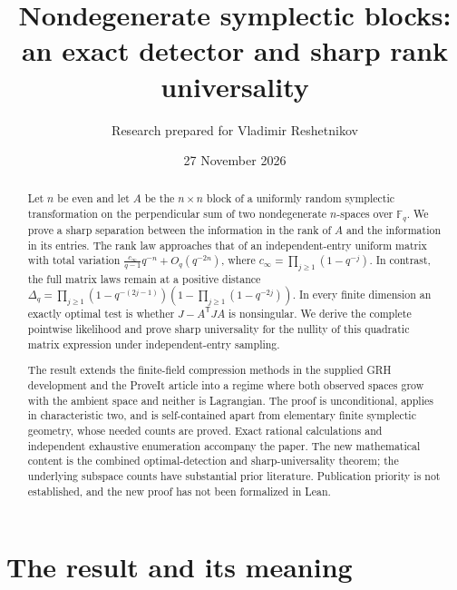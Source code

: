 \documentclass[11pt]{article}
\title{\textcolor{ink}{Nondegenerate symplectic blocks:}\\
an exact detector and sharp rank universality}
\author{Research prepared for Vladimir Reshetnikov}
\date{27 November 2026}
\theoremstyle{definition}\newtheorem{definition}[theorem]{Definition}
\theoremstyle{remark}\newtheorem{remark}[theorem]{Remark}
\newcommand{\F}{\mathbb F}
\newcommand{\1}{\mathbf 1}
\begin{document}
\maketitle
\begin{abstract}
Let $n$ be even and let $A$ be the $n\times n$ block of a uniformly random
symplectic transformation on the perpendicular sum of two nondegenerate
$n$-spaces over $\F_q$. We prove a sharp separation between the information
in the rank of $A$ and the information in its entries. The rank law approaches
that of an independent-entry uniform matrix with total variation
$\frac{c_\infty}{q-1}q^{-n}+O_q(q^{-2n})$, where
$c_\infty=\prod_{j\ge1}(1-q^{-j})$. In contrast, the full matrix laws remain
at a positive distance
$\Delta_q=\prod_{j\ge1}(1-q^{-(2j-1)})(1-\prod_{j\ge1}(1-q^{-2j}))$.
In every finite dimension an exactly optimal test is whether
$J-A^{\mathsf T}JA$ is nonsingular. We derive the complete pointwise
likelihood and prove sharp universality for the nullity of this quadratic
matrix expression under independent-entry sampling.

The result extends the finite-field compression methods in the supplied
GRH development and the ProveIt article into a regime where both observed
spaces grow with the ambient space and neither is Lagrangian. The proof is
unconditional, applies in characteristic two, and is self-contained apart
from elementary finite symplectic geometry, whose needed counts are proved.
Exact rational calculations and independent exhaustive enumeration accompany
the paper. The new mathematical content is the combined optimal-detection
and sharp-universality theorem; the underlying subspace counts have substantial
prior literature. Publication priority is not established, and the new proof
has not been formalized in Lean.
\end{abstract}

\setcounter{tocdepth}{1}\tableofcontents

\section{The result and its meaning}\label{sec:result}
\end{document}
